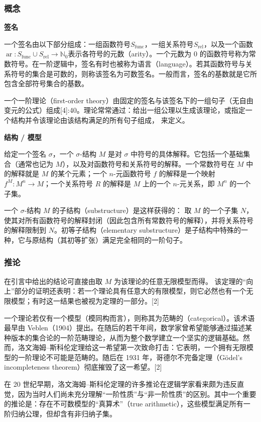 \subsubsection{概念}
\textbf{签名}

一个签名由以下部分组成：一组函数符号\(S_{\text{func}}\)，一组关系符号\(S_{\text{rel}}\)，以及一个函数\(\operatorname{ar} : S_{\text{func}} \cup S_{\text{rel}} \to \mathbb{N}_0\)表示各符号的元数（arity）。一个元数为 0 的函数符号称为常数符号。在一阶逻辑中，签名有时也被称为语言（language）。若其函数符号与关系符号的集合是可数的，则称该签名为可数签名。一般而言，签名的基数就是它所包含全部符号集合的基数。

一个一阶理论（first-order theory）由固定的签名与该签名下的一组句子（无自由变元的公式）组成[4]:40。理论常常通过：给出一组公理以生成该理论，或指定一个结构并令该理论由该结构满足的所有句子组成，  
来定义。

\textbf{结构 / 模型}

给定一个签名 \(\sigma\)，一个 \(\sigma\)-结构 \(M\) 是对 \(\sigma\) 中符号的具体解释。它包括一个基础集合（通常也记为 \(M\)），以及对函数符号和关系符号的解释。一个常数符号在 \(M\) 中的解释就是 \(M\) 的某个元素；一个 \(n\)-元函数符号 \(f\) 的解释是一个映射 \(f^M : M^n \to M\)；一个关系符号 \(R\) 的解释是 \(M\) 上的一个 \(n\)-元关系，即 \(M^n\) 的一个子集。

一个 \(\sigma\)-结构 \(M\) 的子结构（substructure）是这样获得的：  
取 \(M\) 的一个子集 \(N\)，使其对所有函数符号的解释封闭（因此包含所有常数符号的解释），并将关系符号的解释限制到 \(N\)。初等子结构（elementary substructure）是子结构中特殊的一种，它与原结构（其初等扩张）满足完全相同的一阶句子。
\subsubsection{推论}
在引言中给出的结论可直接由取 \( M \) 为该理论的任意无限模型而得。  
该定理的“向上”部分的证明还表明：若一个理论具有任意大的有限模型，则它必然也有一个无限模型；有时这一结果也被视为定理的一部分。[2]

一个理论若仅有一个模型（模同构而言），则称其为范畴的（categorical）。该术语最早由 Veblen（1904）提出。在随后的若干年间，数学家曾希望能够通过描述某种版本的集合论的一阶范畴理论，从而为整个数学建立一个坚实的逻辑基础。然而，洛文海姆–斯科伦定理给这一希望第一次致命打击：它表明，一个拥有无限模型的一阶理论不可能是范畴的。随后在 1931 年，哥德尔不完备定理（Gödel’s incompleteness theorem）彻底摧毁了这一希望。[2]

在 20 世纪早期，洛文海姆–斯科伦定理的许多推论在逻辑学家看来颇为违反直觉，因为当时人们尚未充分理解“一阶性质”与“非一阶性质”的区别。其中一个重要的推论是：存在不可数模型的“真算术”（true arithmetic），这些模型满足所有一阶归纳公理，但却含有非归纳子集。

